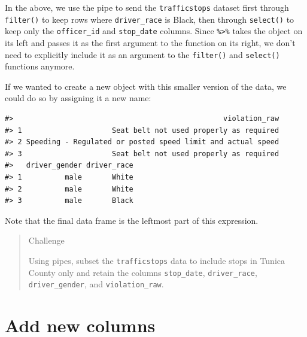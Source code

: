 \documentclass[]{book}
\newenvironment{Shaded}{\begin{snugshade}}{\end{snugshade}}
\newcommand{\KeywordTok}[1]{\textcolor[rgb]{0.13,0.29,0.53}{\textbf{#1}}}
\newcommand{\DecValTok}[1]{\textcolor[rgb]{0.00,0.00,0.81}{#1}}
\newcommand{\StringTok}[1]{\textcolor[rgb]{0.31,0.60,0.02}{#1}}
\newcommand{\OperatorTok}[1]{\textcolor[rgb]{0.81,0.36,0.00}{\textbf{#1}}}
\newcommand{\NormalTok}[1]{#1}
\theoremstyle{definition}
\theoremstyle{definition}
\theoremstyle{definition}
\theoremstyle{remark}
\begin{document}
In the above, we use the pipe to send the \texttt{trafficstops} dataset
first through \texttt{filter()} to keep rows where \texttt{driver\_race}
is Black, then through \texttt{select()} to keep only the
\texttt{officer\_id} and \texttt{stop\_date} columns. Since
\texttt{\%\textgreater{}\%} takes the object on its left and passes it
as the first argument to the function on its right, we don't need to
explicitly include it as an argument to the \texttt{filter()} and
\texttt{select()} functions anymore.

If we wanted to create a new object with this smaller version of the
data, we could do so by assigning it a new name:

\begin{Shaded}
\end{Shaded}

\begin{verbatim}
#>                                                 violation_raw
#> 1                     Seat belt not used properly as required
#> 2 Speeding - Regulated or posted speed limit and actual speed
#> 3                     Seat belt not used properly as required
#>   driver_gender driver_race
#> 1          male       White
#> 2          male       White
#> 3          male       Black
\end{verbatim}

Note that the final data frame is the leftmost part of this expression.

\begin{quote}
Challenge

Using pipes, subset the \texttt{trafficstops} data to include stops in
Tunica County only and retain the columns \texttt{stop\_date},
\texttt{driver\_race}, \texttt{driver\_gender}, and
\texttt{violation\_raw}.
\end{quote}

\section{Add new columns}\label{add-new-columns}
\end{document}
